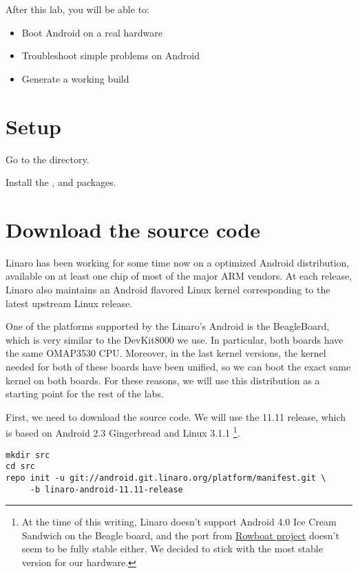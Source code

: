
After this lab, you will be able to:
\begin{itemize}
  \item Boot Android on a real hardware
  \item Troubleshoot simple problems on Android
  \item Generate a working build
\end{itemize}

\section{Setup}

Go to the  directory.

Install the ,  and
 packages.

\section{Download the source code}

Linaro has been working for some time now on a optimized Android distribution,
available on at least one chip of most of the major ARM vendors. At each release,
Linaro also maintains an Android flavored Linux kernel corresponding to the latest
upstream Linux release.

One of the platforms supported by the Linaro's Android is the BeagleBoard, which
is very similar to the DevKit8000 we use. In particular, both boards have the
same OMAP3530 CPU. Moreover, in the last kernel versions,
the kernel needed for both of these boards have been unified, so we can boot the
exact same kernel on both boards. For these reasons, we will use this
distribution as a starting point for the rest of the labs.

First, we need to download the source code. We will use the 11.11 release, which
is based on Android 2.3 Gingerbread and Linux 3.1.1
\footnote{At the time of this writing, Linaro doesn't support Android 4.0 Ice Cream
Sandwich on the Beagle board, and the port from \href{http://code.google.com/p/rowboat}
{Rowboat project} doesn't seem to be fully stable either. We decided to stick
with the most stable version for our hardware.}.

\begin{verbatim}
mkdir src
cd src
repo init -u git://android.git.linaro.org/platform/manifest.git \
     -b linaro-android-11.11-release
\end{verbatim}

